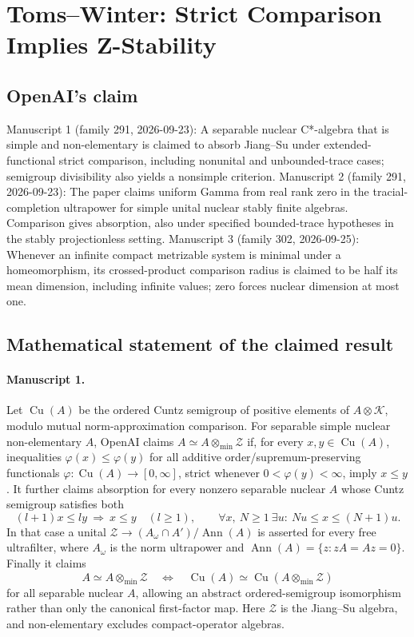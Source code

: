 \documentclass[11pt]{article}
\begin{document}
\section*{Toms–Winter: Strict Comparison Implies Z-Stability}

\subsection{OpenAI's claim}
Manuscript 1 (family 291, 2026-09-23): A separable nuclear C*-algebra that is simple and non-elementary is claimed to absorb Jiang--Su under extended-functional strict comparison, including nonunital and unbounded-trace cases; semigroup divisibility also yields a nonsimple criterion. Manuscript 2 (family 291, 2026-09-23): The paper claims uniform Gamma from real rank zero in the tracial-completion ultrapower for simple unital nuclear stably finite algebras. Comparison gives absorption, also under specified bounded-trace hypotheses in the stably projectionless setting. Manuscript 3 (family 302, 2026-09-25): Whenever an infinite compact metrizable system is minimal under a homeomorphism, its crossed-product comparison radius is claimed to be half its mean dimension, including infinite values; zero forces nuclear dimension at most one.

\subsection{Mathematical statement of the claimed result}
\paragraph{Manuscript 1.}
Let $\operatorname{Cu}(A)$ be the ordered Cuntz semigroup of positive elements of $A\otimes\mathcal K$, modulo mutual norm-approximation comparison. For separable simple nuclear non-elementary $A$, OpenAI claims $A\simeq A\otimes_{\min}\mathcal Z$ if, for every $x,y\in\operatorname{Cu}(A)$, inequalities $\varphi(x)\le\varphi(y)$ for all additive order/supremum-preserving functionals $\varphi:\operatorname{Cu}(A)\to[0,\infty]$, strict whenever $0<\varphi(y)<\infty$, imply $x\le y$.
It further claims absorption for every nonzero separable nuclear $A$ whose Cuntz semigroup satisfies both
\[
(l+1)x\le ly\ \Longrightarrow\ x\le y\quad(l\ge1),\qquad
\forall x,\ N\ge1\ \exists u:\ Nu\le x\le(N+1)u.
\]
In that case a unital $\mathcal Z\to (A_\omega\cap A')/\operatorname{Ann}(A)$ is asserted for every free ultrafilter, where $A_\omega$ is the norm ultrapower and $\operatorname{Ann}(A)=\{z:zA=Az=0\}$. Finally it claims
\[
A\simeq A\otimes_{\min}\mathcal Z\quad\Longleftrightarrow\quad
\operatorname{Cu}(A)\simeq\operatorname{Cu}(A\otimes_{\min}\mathcal Z)
\]
for all separable nuclear $A$, allowing an abstract ordered-semigroup isomorphism rather than only the canonical first-factor map. Here $\mathcal Z$ is the Jiang--Su algebra, and non-elementary excludes compact-operator algebras.
\end{document}
